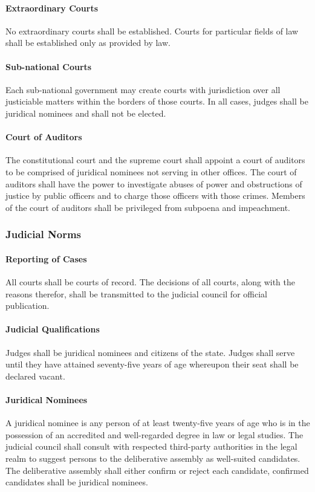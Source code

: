 \documentclass{article}
\begin{document}
\paragraph{Extraordinary Courts}
No extraordinary courts shall be established. Courts for particular fields of law shall be established only as provided by law.
\paragraph{Sub-national Courts}
Each sub-national government may create courts with jurisdiction over all justiciable matters within the borders of those courts. In all cases, judges shall be juridical nominees and shall not be elected.
\paragraph{Court of Auditors}
The constitutional court and the supreme court shall appoint a court of auditors to be comprised of juridical nominees not serving in other offices. The court of auditors shall have the power to investigate abuses of power and obstructions of justice by public officers and to charge those officers with those crimes. Members of the court of auditors shall be privileged from subpoena and impeachment.
\subsubsection{Judicial Norms}
\paragraph{Reporting of Cases}
All courts shall be courts of record. The decisions of all courts, along with the reasons therefor, shall be transmitted to the judicial council for official publication.
\paragraph{Judicial Qualifications}
Judges shall be juridical nominees and citizens of the state. Judges shall serve until they have attained seventy-five years of age whereupon their seat shall be declared vacant.
\paragraph{Juridical Nominees}
A juridical nominee is any person of at least twenty-five years of age who is in the possession of an accredited and well-regarded degree in law or legal studies. The judicial council shall consult with respected third-party authorities in the legal realm to suggest persons to the deliberative assembly as well-suited candidates. The deliberative assembly shall either confirm or reject each candidate, confirmed candidates shall be juridical nominees.
\end{document}
